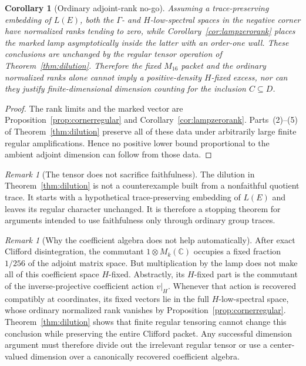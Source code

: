 \documentclass[11pt]{article}
\newtheorem{corollary}[theorem]{Corollary}
\theoremstyle{definition}
\theoremstyle{remark}
\newtheorem{remark}[theorem]{Remark}
\newcommand{\C}{\mathbb C}
\begin{document}
\begin{corollary}[Ordinary adjoint-rank no-go]\label{cor:ranknogo}
Assuming a trace-preserving embedding of $L(E)$, both the $\Gamma$- and
$H$-low-spectral spaces in the negative corner have normalized ranks tending
to zero, while Corollary~\ref{cor:lampzerorank} places the marked lamp
asymptotically inside the latter with an order-one wall.  These conclusions
are unchanged by the regular tensor operation of
Theorem~\ref{thm:dilution}.  Therefore the fixed $M_{16}$ packet and the
ordinary normalized ranks alone cannot imply a positive-density
$H$-fixed excess, nor can they justify finite-dimensional dimension
counting for the inclusion $C\subseteq D$.
\end{corollary}

\begin{proof}
The rank limits and the marked vector are Proposition~\ref{prop:cornerregular}
and Corollary~\ref{cor:lampzerorank}.  Parts~(2)--(5) of
Theorem~\ref{thm:dilution} preserve all of these data under arbitrarily large
finite regular amplifications.  Hence no positive lower bound proportional
to the ambient adjoint dimension can follow from those data.
\end{proof}

\begin{remark}[The tensor does not sacrifice faithfulness]
The dilution in Theorem~\ref{thm:dilution} is not a counterexample built
from a nonfaithful quotient trace.  It starts with a hypothetical
trace-preserving embedding of $L(E)$ and leaves its regular character
unchanged.  It is therefore a stopping theorem for arguments intended to
use faithfulness only through ordinary group traces.
\end{remark}

\begin{remark}[Why the coefficient algebra does not help automatically]
After exact Clifford disintegration, the commutant
$1\otimes M_k(\C)$ occupies a fixed fraction $1/256$ of the adjoint matrix
space.  But multiplication by the lamp does not make all of this coefficient
space $H$-fixed.  Abstractly, its $H$-fixed part is the commutant of the
inverse-projective coefficient action $v|_H$.  Whenever that action is
recovered compatibly at coordinates, its fixed vectors lie in the full
$H$-low-spectral space, whose ordinary normalized rank vanishes by
Proposition~\ref{prop:cornerregular}.  Theorem~\ref{thm:dilution} shows that
finite regular tensoring cannot change this conclusion while preserving the
entire Clifford packet.  Any successful dimension argument must therefore
divide out the irrelevant regular tensor or use a center-valued dimension
over a canonically recovered coefficient algebra.
\end{remark}
\end{document}
